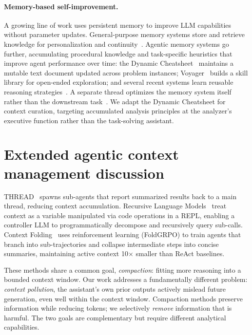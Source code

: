 \documentclass{article}
\begin{document}
\paragraph{Memory-based self-improvement.}
A growing line of work uses persistent memory to improve LLM capabilities without parameter updates. General-purpose memory systems store and retrieve knowledge for personalization and continuity~\citep{xu2025amem,zhou2025mem1}. Agentic memory systems go further, accumulating procedural knowledge and task-specific heuristics that improve agent performance over time: the Dynamic Cheatsheet~\citep{suzgun2025cheatsheet} maintains a mutable text document updated across problem instances; Voyager~\citep{wang2023voyager} builds a skill library for open-ended exploration; and several recent systems learn reusable reasoning strategies~\citep{ouyang2026reasoningbank,ho2025arcmemo,fang2026memp,wu2025evolver,zhang2026ace}. A separate thread optimizes the memory system itself rather than the downstream task~\citep{zhang2025memevolve,xiong2026alma}. We adapt the Dynamic Cheatsheet for context curation, targeting accumulated analysis principles at the analyzer's executive function rather than the task-solving assistant.

\section{Extended agentic context management discussion}
\label{app:agentic-context}

THREAD~\citep{schroeder2025thread} spawns sub-agents that report summarized results back to a main thread, reducing context accumulation. Recursive Language Models~\citep{zhang2025rlm} treat context as a variable manipulated via code operations in a REPL, enabling a controller LLM to programmatically decompose and recursively query sub-calls. Context Folding~\citep{sun2025contextfolding} uses reinforcement learning (FoldGRPO) to train agents that branch into sub-trajectories and collapse intermediate steps into concise summaries, maintaining active context 10$\times$ smaller than ReAct baselines.

These methods share a common goal, \emph{compaction}: fitting more reasoning into a bounded context window. Our work addresses a fundamentally different problem: \emph{context pollution}, the assistant's own prior outputs actively mislead future generation, even well within the context window. Compaction methods preserve information while reducing tokens; we selectively \emph{remove} information that is harmful. The two goals are complementary but require different analytical capabilities.
\end{document}
